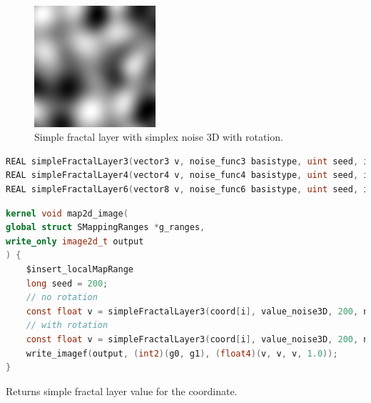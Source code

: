 \begin{figure}[h]
\centering
\includegraphics[width=0.4\textwidth]{out/simpleFractalLayer3/simpleFractalLayer3_simplex_noise3D_noInterp_rot.png}
\caption{Simple fractal layer with simplex noise 3D with rotation.}
\label{fig:simple_fractal_layer3_simplex_noise3D_noInterp_rot}
\end{figure}

\begin{lstlisting}[caption={Definition of simple fractal layer functions},label={lst:simple_fractal_layer_definition},language=OpenCL]
REAL simpleFractalLayer3(vector3 v, noise_func3 basistype, uint seed, interp_func interp, REAL layerscale, REAL layerfreq, bool rot, REAL angle, REAL ax, REAL ay, REAL az);
REAL simpleFractalLayer4(vector4 v, noise_func4 basistype, uint seed, interp_func interp, REAL layerscale, REAL layerfreq, bool rot, REAL angle, REAL ax, REAL ay, REAL az);
REAL simpleFractalLayer6(vector8 v, noise_func6 basistype, uint seed, interp_func interp, REAL layerscale, REAL layerfreq, bool rot, REAL angle, REAL ax, REAL ay, REAL az);
\end{lstlisting}

\begin{lstlisting}[caption={Example for simple fractal layer functions},label={lst:simple_fractal_layer_example},language=OpenCL]
kernel void map2d_image(
global struct SMappingRanges *g_ranges,
write_only image2d_t output
) {
    $insert_localMapRange
    long seed = 200;
    // no rotation
    const float v = simpleFractalLayer3(coord[i], value_noise3D, 200, noInterp, 1, 0.125, false, 0.0, 0.0, 0.0, 0.0);
    // with rotation
    const float v = simpleFractalLayer3(coord[i], value_noise3D, 200, noInterp, 1, 0.125, true, 1.57, 1.0, 0.0, 0.0);
    write_imagef(output, (int2)(g0, g1), (float4)(v, v, v, 1.0));
}
\end{lstlisting}

Returns simple fractal layer value for the coordinate.

